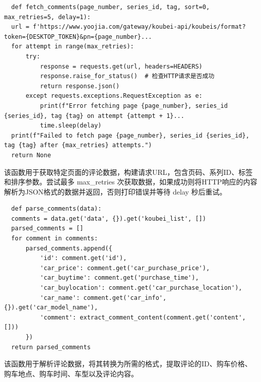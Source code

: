 \documentclass[UTF8,a4paper,15pt,titlepage,oneside]{ctexbook}
\begin{document}
    \begin{mdframed}[backgroundcolor=darkgray, linecolor=lightgray, linewidth=1pt, innermargin=0.5cm, outermargin=0.5cm, skipbelow=0.1cm]
      \color{white}
      \begin{verbatim}
  def fetch_comments(page_number, series_id, tag, sort=0, max_retries=5, delay=1):
  url = f'https://www.yoojia.com/gateway/koubei-api/koubeis/format?token={DESKTOP_TOKEN}&pn={page_number}...
  for attempt in range(max_retries):
      try:
          response = requests.get(url, headers=HEADERS)
          response.raise_for_status()  # 检查HTTP请求是否成功
          return response.json()
      except requests.exceptions.RequestException as e:
          print(f"Error fetching page {page_number}, series_id {series_id}, tag {tag} on attempt {attempt + 1}...
          time.sleep(delay)
  print(f"Failed to fetch page {page_number}, series_id {series_id}, tag {tag} after {max_retries} attempts.")
  return None
      \end{verbatim}
      \vspace{-1.5em} %
      \end{mdframed}

      该函数用于获取特定页面的评论数据，构建请求URL，包含页码、系列ID、标签和排序参数。尝试最多 max\_retries 次获取数据，如果成功则将HTTP响应的内容解析为JSON格式的数据并返回，否则打印错误并等待 delay 秒后重试。

  \begin{mdframed}[backgroundcolor=darkgray, linecolor=lightgray, linewidth=1pt, innermargin=0.5cm, outermargin=0.5cm, skipbelow=0.1cm]
    \color{white}
    \begin{verbatim}
  def parse_comments(data):
  comments = data.get('data', {}).get('koubei_list', [])
  parsed_comments = []
  for comment in comments:
      parsed_comments.append({
          'id': comment.get('id'),
          'car_price': comment.get('car_purchase_price'),
          'car_buytime': comment.get('purchase_time'),
          'car_buylocation': comment.get('car_purchase_location'),
          'car_name': comment.get('car_info', {}).get('car_model_name'),
          'comment': extract_comment_content(comment.get('content', []))
      })
  return parsed_comments
  \end{verbatim}
  \vspace{-1.5em} %
  \end{mdframed}

  该函数用于解析评论数据，将其转换为所需的格式，提取评论的ID、购车价格、购车地点、购车时间、车型以及评论内容。
\end{document}
